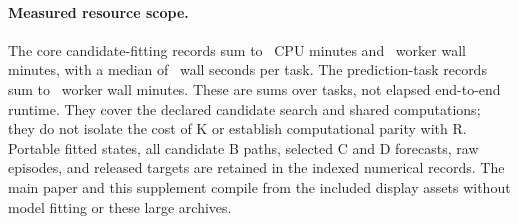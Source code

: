 \paragraph{Measured resource scope.}
The core candidate-fitting records sum to \JSFitCpuMinutes\ CPU minutes and
\JSFitWallSumMinutes\ worker wall minutes, with a median of
\JSFitMedianSeconds\ wall seconds per task. The prediction-task
records sum to \JSQueryWallSumMinutes\ worker wall minutes.
These are sums over tasks, not elapsed end-to-end runtime.
They cover the declared candidate search and shared computations;
they do not isolate the cost of K or establish computational parity
with R. Portable fitted states, all candidate B paths, selected C
and D forecasts, raw episodes, and released targets are retained
in the indexed numerical records. The main paper and this
supplement compile from the included display assets without model
fitting or these large archives.
\FloatBarrier
